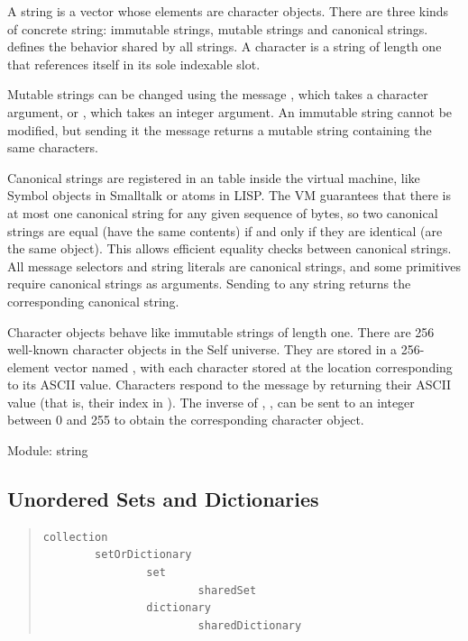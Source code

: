 \documentclass[letterpaper,10pt,english]{sphinxmanual}
\begin{document}
A string is a vector whose elements are character objects. There are three kinds of concrete string:
immutable strings, mutable strings and canonical strings.  defines the behavior
shared by all strings. A character is a string of length one that references itself in its sole indexable
slot.

Mutable strings can be changed using the message , which takes a character argument, or
, which takes an integer argument. An immutable string cannot be modified, but
sending it the  message returns a mutable string containing the same characters.

Canonical strings are registered in an table inside the virtual machine, like Symbol objects in
Smalltalk or atoms in LISP. The VM guarantees that there is at most one canonical string for any
given sequence of bytes, so two canonical strings are equal (have the same contents) if and only if
they are identical (are the same object). This allows efficient equality checks between canonical
strings. All message selectors and string literals are canonical strings, and some primitives require
canonical strings as arguments. Sending  to any string returns the corresponding
canonical string.

Character objects behave like immutable strings of length one. There are 256 well-known character
objects in the Self universe. They are stored in a 256-element vector named , with each
character stored at the location corresponding to its ASCII value. Characters respond to the message
 by returning their ASCII value (that is, their index in ). The inverse of ,
, can be sent to an integer between 0 and 255 to obtain the corresponding
character object.

Module: string


\subsection{Unordered Sets and Dictionaries}
\label{collections:unordered-sets-and-dictionaries}\begin{quote}

\begin{Verbatim}[commandchars=\\\{\}]
collection
        setOrDictionary
                set
                        sharedSet
                dictionary
                        sharedDictionary
\end{Verbatim}
\end{quote}
\end{document}
